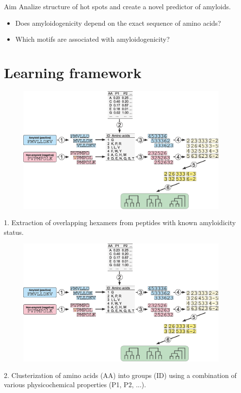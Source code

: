 \documentclass{beamer}\usepackage[]{graphicx}\usepackage[]{color}
\begin{document}
  \begin{frame}{Aim}
  Analize structure of hot spots and create a novel predictor of amyloids.
  \begin{itemize}
  \item Does amyloidogenicity depend on the exact sequence of amino acids?
  \item Which motifs are associated with amyloidogenicity?
  \end{itemize}
  \end{frame}
  
  
\section{Learning framework}  
  
    \begin{frame}{}
\begin{figure} 
\includegraphics[width=0.95\textwidth]{static_figure/scheme.eps}
\end{figure}

1. Extraction of overlapping hexamers from peptides with known amyloidicity status. 
  \end{frame}

    \begin{frame}{}
\begin{figure} 
\includegraphics[width=0.95\textwidth]{static_figure/scheme.eps}
\end{figure}

2. Clusterization of amino acids (AA) into groups (ID) using a combination of various 
physicochemical properties (P1, P2, ...).   
\end{frame}
\end{document}
